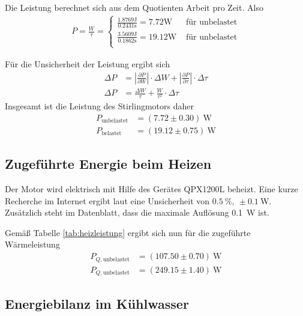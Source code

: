 \documentclass{article}
\begin{document}
Die Leistung berechnet sich aus dem Quotienten Arbeit pro Zeit. Also
\begin{align}
P = \frac{W}{\tau} = \begin{cases} \frac{1.8769 \text{J}}{0.2431 \text{s}} = 7.72 \text{W} & \text{ für unbelastet} \\ \frac{3.5609 \text{J}}{0.1862 \text{s}} = 19.12 \text{W} & \text{ für unbelastet} \\\end{cases}
\end{align}

Für die Unsicherheit der Leistung ergibt sich
\begin{align}
\Delta P &= \left|\frac{\partial P}{\partial W}\right| \cdot \Delta W + \left|\frac{\partial P}{\partial \tau}\right| \cdot \Delta \tau \\
\Delta P &= \frac{\Delta W}{\tau} + \frac{W}{\tau^2}\cdot \Delta \tau
\end{align}
Insgesamt ist die Leistung des Stirlingmotors daher
\begin{align*}
P_{\text{unbelastet}} &= (7.72 \pm 0.30)~\text{W} \\P_{\text{belastet}} &= (19.12 \pm 0.75)~\text{W} 
\end{align*}



\subsection{Zugeführte Energie beim Heizen}

Der Motor wird elektrisch mit Hilfe des Gerätes QPX1200L beheizt. Eine kurze Recherche im Internet ergibt laut \cite{heizung} eine Unsicherheit von $0.5~\%,~ \pm0.1~$W. Zusätzlich steht im Datenblatt, dass die maximale Auflösung 0.1~W ist.


Gemäß Tabelle \ref{tab:heizleistung} ergibt sich nun für die zugeführte Wärmeleistung
\begin{align*}
P_{Q,\text{unbelastet}} &= (107.50 \pm 0.70)~\text{W} \\
P_{Q,\text{unbelastet}} &= (249.15 \pm 1.40	)~\text{W}
\end{align*}



\subsection{Energiebilanz im Kühlwasser}
\end{document}
